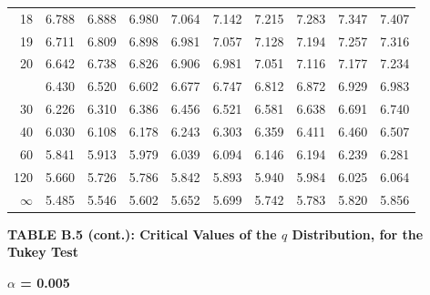 \documentclass[10pt]{article}
\begin{document}
\begin{longtable}{@{}r!{\vrule width 0.8pt\hspace{0.55em}}rrrrrrrrr@{}}
18 & 6.788 & 6.888 & 6.980 & 7.064 & 7.142 & 7.215 & 7.283 & 7.347 & 7.407 \\
19 & 6.711 & 6.809 & 6.898 & 6.981 & 7.057 & 7.128 & 7.194 & 7.257 & 7.316 \\
20 & 6.642 & 6.738 & 6.826 & 6.906 & 6.981 & 7.051 & 7.116 & 7.177 & 7.234 \\
 & 6.430 & 6.520 & 6.602 & 6.677 & 6.747 & 6.812 & 6.872 & 6.929 & 6.983 \\
30 & 6.226 & 6.310 & 6.386 & 6.456 & 6.521 & 6.581 & 6.638 & 6.691 & 6.740 \\
40 & 6.030 & 6.108 & 6.178 & 6.243 & 6.303 & 6.359 & 6.411 & 6.460 & 6.507 \\
60 & 5.841 & 5.913 & 5.979 & 6.039 & 6.094 & 6.146 & 6.194 & 6.239 & 6.281 \\
120 & 5.660 & 5.726 & 5.786 & 5.842 & 5.893 & 5.940 & 5.984 & 6.025 & 6.064 \\
\addlinespace[0.30em]
$\infty$ & 5.485 & 5.546 & 5.602 & 5.652 & 5.699 & 5.742 & 5.783 & 5.820 & 5.856 \\
\end{longtable}
\newpage
\thispagestyle{empty}
\begin{center}
{\large\bfseries TABLE B.5 (cont.): Critical Values of the $q$ Distribution, for the Tukey Test\par}
\end{center}
{\large\bfseries $\alpha$ = 0.005\par}
\vspace{0.45em}
\small
\end{document}
